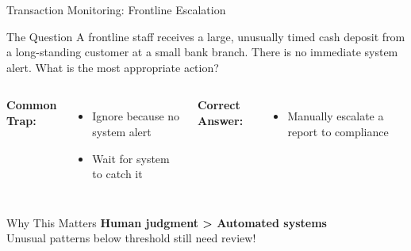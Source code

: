 \documentclass{beamer}
\begin{document}
\begin{frame}{Transaction Monitoring: Frontline Escalation}
\begin{block}{The Question}
\small{A frontline staff receives a large, unusually timed cash deposit from a long-standing customer at a small bank branch. There is no immediate system alert. What is the most appropriate action?}
\end{block}

\begin{columns}
\textcolor{wrong}{\textbf{ Common Trap:}}
\begin{itemize}
    \item Ignore because no system alert
    \item Wait for system to catch it
\end{itemize}

\textcolor{correct}{\textbf{Correct Answer:}}
\begin{itemize}
    \item Manually escalate a report to compliance
\end{itemize}
\end{columns}

\begin{block}{Why This Matters}
\textbf{Human judgment > Automated systems} \\
Unusual patterns below threshold still need review!
\end{block}
\end{frame}

\end{document}
